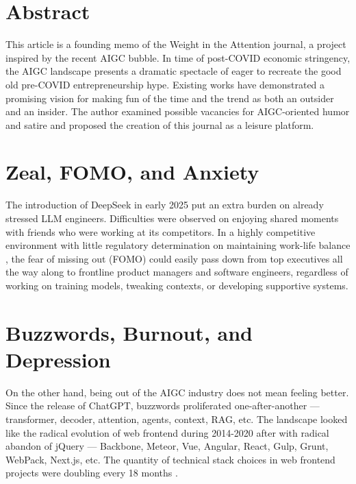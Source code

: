 





\section*{Abstract}
This article is a founding memo of the Weight in the Attention journal, a project inspired by the recent AIGC bubble.
In time of post-COVID economic stringency, the AIGC landscape presents a dramatic spectacle
of eager to recreate the good old pre-COVID entrepreneurship hype.
Existing works \cite{agibar} have demonstrated a promising vision
for making fun of the time and the trend as both an outsider and an insider.
The author examined possible vacancies for AIGC-oriented humor and satire and proposed
the creation of this journal as a leisure platform.







\section{Zeal, FOMO, and Anxiety}
The introduction of DeepSeek in early 2025 put an extra burden \cite{tonypengds}
on already stressed LLM engineers.
Difficulties were observed on enjoying shared moments with friends who were working at its competitors.
In a highly competitive environment with little regulatory determination on maintaining work-life balance \cite{ZhengQiu996} \cite{Liu02012025},
the fear of missing out (FOMO) could easily pass down from top executives all the way along to
frontline product managers and software engineers,
regardless of working on training models, tweaking contexts, or developing supportive systems.



\section{Buzzwords, Burnout, and Depression}
On the other hand, being out of the AIGC industry does not mean feeling better.
Since the release of ChatGPT, buzzwords proliferated one-after-another ---
transformer, decoder, attention, agents, context, RAG, etc.
The landscape looked like the radical evolution of web frontend during 2014-2020 after with radical abandon of jQuery ---
Backbone, Meteor, Vue, Angular, React, Gulp, Grunt, WebPack, Next.js, etc.
The quantity of technical stack choices in web frontend projects were doubling every 18 months \cite{Moore1965}.

